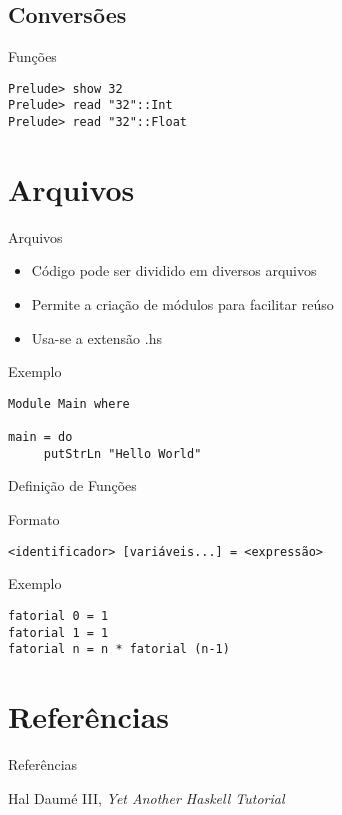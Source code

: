 \documentclass{beamer}
\begin{document}
		\subsection{Conversões}

			\begin{frame}[fragile]{Funções}
			 \begin{block}{}
			  \begin{lstlisting}
Prelude> show 32
Prelude> read "32"::Int
Prelude> read "32"::Float
			  \end{lstlisting}
			 \end{block}			 
			\end{frame}

	\section{Arquivos}
	
		\begin{frame}[fragile]{Arquivos}
		 \begin{itemize}
		  \item Código pode ser dividido em diversos arquivos
		  \item Permite a criação de módulos para facilitar reúso
		  \item Usa-se a extensão .hs
		 \end{itemize}
		 
		 \begin{block}{Exemplo}
		  \begin{lstlisting}
Module Main where

main = do
     putStrLn "Hello World"
		  \end{lstlisting}
		 \end{block}
		\end{frame}
		
		\begin{frame}[fragile]{Definição de Funções}
		 \begin{block}{Formato}
		  \begin{lstlisting}
<identificador> [variáveis...] = <expressão>
		  \end{lstlisting}
		 \end{block}
		 
		 \begin{block}{Exemplo}
		  \begin{lstlisting}
fatorial 0 = 1
fatorial 1 = 1
fatorial n = n * fatorial (n-1)
		  \end{lstlisting}
		 \end{block}
		\end{frame}
			
\section{Referências}
\begin{frame}{Referências}
	\begin{thebibliography}{9}
	 Hal Daumé III, \textit{Yet Another Haskell Tutorial}
	\end{thebibliography}
\end{frame}
	
	
\end{document}
